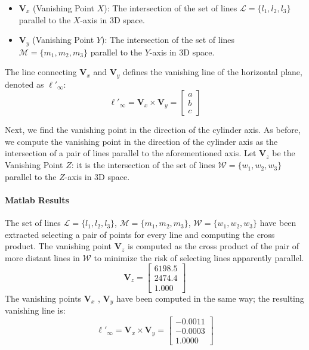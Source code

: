 \documentclass[a4paper,11pt]{article}
\newcommand{\vect}[1]{\mathbf{#1}}  %
\begin{document}
\begin{itemize}
    \item $\vect{V}_x$ (Vanishing Point $X$): The intersection of the set of lines $\mathcal{L} = \{l_1, l_2, l_3\}$ parallel to the $X$-axis in 3D space.
    \item $\vect{V}_y$ (Vanishing Point $Y$): The intersection of the set of lines $\mathcal{M} = \{m_1, m_2, m_3\}$ parallel to the $Y$-axis in 3D space.
\end{itemize}

The line connecting $\vect{V}_x$ and $\vect{V}_y$ defines the vanishing line of the horizontal plane, denoted as $\ell'_\infty$:
\begin{equation}
    \ell'_\infty = \vect{V}_x \times \vect{V}_y = 
    \begin{bmatrix}
    a \\
    b \\
    c
    \end{bmatrix}
\end{equation}

Next, we find the vanishing point in the direction of the cylinder axis. As before, we compute the vanishing point in the direction of the cylinder axis as the intersection of a pair of lines parallel to the aforementioned axis. Let $\vect{V}_z$ be the Vanishing Point $Z$: it is the intersection of the set of lines $\mathcal{W} = \{w_1, w_2, w_3\}$ parallel to the $Z$-axis in 3D space.

\paragraph{Matlab Results}
The set of lines $\mathcal{L} = \{l_1, l_2, l_3\}$, $\mathcal{M} = \{m_1, m_2, m_3\}$, $\mathcal{W} = \{w_1, w_2, w_3\}$ have been extracted selecting a pair of points for every line and computing the cross product. The vanishing point $\vect{V}_z$ is computed as the cross product of the pair of more distant lines in $\mathcal{W}$ to minimize the risk of selecting lines apparently parallel.
\begin{equation}
    \vect{V}_z = 
    \begin{bmatrix}
       6198.5 \\
    2474.4 \\
    1.000 
    \end{bmatrix}
\end{equation}
The vanishing points $\vect{V}_x$ , $\vect{V}_y$ have been computed in the same way; the resulting vanishing line is:
\begin{equation}
    \ell'_\infty = \vect{V}_x \times \vect{V}_y = 
    \begin{bmatrix}
        -0.0011 \\
        -0.0003 \\
        1.0000 
    \end{bmatrix}
\end{equation}
\end{document}
